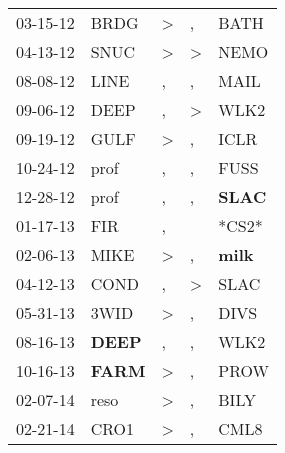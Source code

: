 \begin{supertabular}{p{0.07\textwidth}p{0.06\textwidth}p{0.02\textwidth}p{0.02\textwidth}p{0.06\textwidth}}
          03-15-12\textsuperscript{} &           BRDG\textsuperscript{} &     \textgreater &             , &           BATH\textsuperscript{} \\
          04-13-12\textsuperscript{} &           SNUC\textsuperscript{} &     \textgreater &  \textgreater &           NEMO\textsuperscript{} \\
          08-08-12\textsuperscript{} &           LINE\textsuperscript{} &                , &             , &           MAIL\textsuperscript{} \\
          09-06-12\textsuperscript{} &           DEEP\textsuperscript{} &                , &  \textgreater &           WLK2\textsuperscript{} \\
          09-19-12\textsuperscript{} &           GULF\textsuperscript{} &     \textgreater &             , &           ICLR\textsuperscript{} \\
          10-24-12\textsuperscript{} &           prof\textsuperscript{} &                , &             , &           FUSS\textsuperscript{} \\
          12-28-12\textsuperscript{} &           prof\textsuperscript{} &                , &             , &  \textbf{SLAC\textsuperscript{}} \\
          01-17-13\textsuperscript{} &            FIR\textsuperscript{} &                , &               &                            *CS2* \\
          02-06-13\textsuperscript{} &           MIKE\textsuperscript{} &     \textgreater &             , &  \textbf{milk\textsuperscript{}} \\
          04-12-13\textsuperscript{} &           COND\textsuperscript{} &                , &  \textgreater &           SLAC\textsuperscript{} \\
          05-31-13\textsuperscript{} &           3WID\textsuperscript{} &     \textgreater &             , &           DIVS\textsuperscript{} \\
          08-16-13\textsuperscript{} &  \textbf{DEEP\textsuperscript{}} &                , &             , &           WLK2\textsuperscript{} \\
          10-16-13\textsuperscript{} &  \textbf{FARM\textsuperscript{}} &     \textgreater &             , &           PROW\textsuperscript{} \\
          02-07-14\textsuperscript{} &           reso\textsuperscript{} &     \textgreater &             , &           BILY\textsuperscript{} \\
          02-21-14\textsuperscript{} &           CRO1\textsuperscript{} &     \textgreater &             , &           CML8\textsuperscript{} \\

\end{supertabular}
